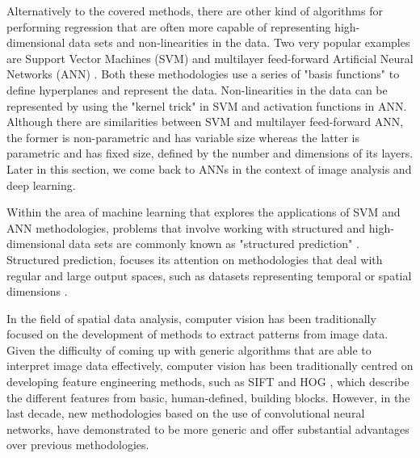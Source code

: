 \bigskip
\bigskip

Alternatively to the covered methods, there are other kind of algorithms for performing regression that are often more capable of representing high-dimensional data sets and non-linearities in the data. Two very popular examples are Support Vector Machines (SVM) \citep{hearst1998support} and multilayer feed-forward Artificial Neural Networks (ANN) \citep{hornik1989multilayer}. Both these methodologies use a series of "basis functions" to define hyperplanes and represent the data. Non-linearities in the data can be represented by using the "kernel trick" \citep{mika1999fisher} in SVM and activation functions in ANN. Although there are similarities between SVM and multilayer feed-forward ANN, the former is non-parametric and has variable size whereas the latter is parametric and has fixed size, defined by the number and dimensions of its layers. Later in this section, we come back to ANNs in the context of image analysis and deep learning.

\medskip

Within the area of machine learning that explores the applications of SVM and ANN methodologies, problems that involve working with structured and high-dimensional data sets are commonly known as "structured prediction" \citep{taskar2005learning}. Structured prediction, focuses its attention on methodologies that deal with regular and large output spaces, such as datasets representing temporal or spatial dimensions \citep{gupta2010estimating,tran2012max}.

\medskip

In the field of spatial data analysis, computer vision has been traditionally focused on the development of methods to extract patterns from image data. Given the difficulty of coming up with generic algorithms that are able to interpret image data effectively, computer vision has been traditionally centred on developing feature engineering methods, such as SIFT \citep{lowe2004distinctive} and HOG \citep{dalal2005histograms}, which describe the different features from basic, human-defined, building blocks. However, in the last decade, new methodologies based on the use of convolutional neural networks, have demonstrated to be more generic and offer substantial advantages over previous methodologies. 

\medskip

